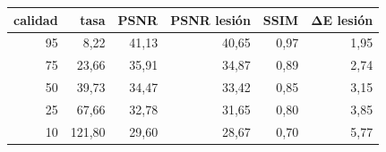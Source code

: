 \begin{tabular}{rrrrrr}
\toprule
calidad & tasa & PSNR & PSNR lesión & SSIM & ΔE lesión \\
\midrule
95 & 8{,}22 & 41{,}13 & 40{,}65 & 0{,}97 & 1{,}95 \\
75 & 23{,}66 & 35{,}91 & 34{,}87 & 0{,}89 & 2{,}74 \\
50 & 39{,}73 & 34{,}47 & 33{,}42 & 0{,}85 & 3{,}15 \\
25 & 67{,}66 & 32{,}78 & 31{,}65 & 0{,}80 & 3{,}85 \\
10 & 121{,}80 & 29{,}60 & 28{,}67 & 0{,}70 & 5{,}77 \\
\bottomrule
\end{tabular}

